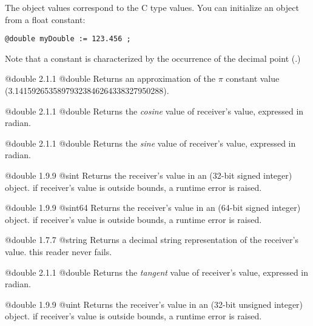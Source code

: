 

The  object values correspond to the C type  values. You can initialize an  object from a float constant:

\texttt{@double myDouble := 123.456 ;}

Note that a  constant is characterized by the occurrence of the decimal point (.)


{@double}
{2.1.1}
{@double}
{Returns an approximation of the $\pi$ constant value (3.14159265358979323846264338327950288).}
{}

{@double}
{2.1.1}
{@double}
{Returns the \emph{cosine} value of receiver's value, expressed in radian.}
{}




{@double}
{2.1.1}
{@double}
{Returns the \emph{sine} value of receiver's value, expressed in radian.}
{}




{@double}
{1.9.9}
{@sint}
{Returns the receiver's value in an  (32-bit signed integer) object.}
{if receiver's value is outside  bounds, a runtime error is raised.}



{@double}
{1.9.9}
{@sint64}
{Returns the receiver's value in an  (64-bit signed integer) object.}
{if receiver's value is outside  bounds, a runtime error is raised.}




{@double}
{1.7.7}
{@string}
{Returns a decimal string representation of the receiver's value.}
{this reader never fails.}




{@double}
{2.1.1}
{@double}
{Returns the \emph{tangent} value of receiver's value, expressed in radian.}
{}







{@double}
{1.9.9}
{@uint}
{Returns the receiver's value in an  (32-bit unsigned integer) object.}
{if receiver's value is outside  bounds, a runtime error is raised.}





